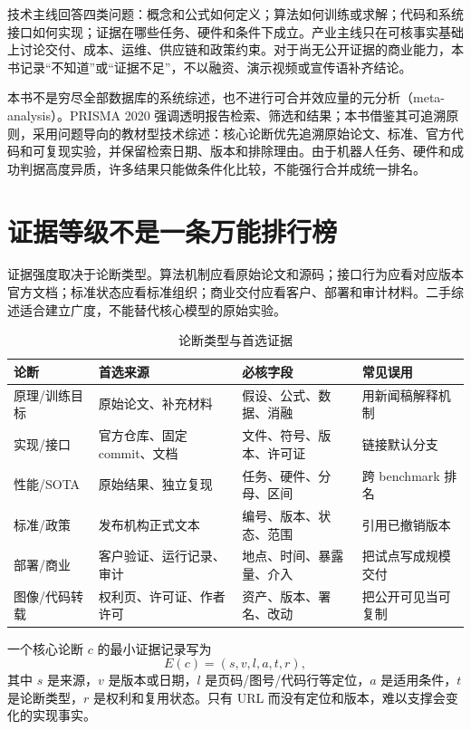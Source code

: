 技术主线回答四类问题：概念和公式如何定义；算法如何训练或求解；代码和系统接口如何实现；证据在哪些任务、硬件和条件下成立。产业主线只在可核事实基础上讨论交付、成本、运维、供应链和政策约束。对于尚无公开证据的商业能力，本书记录“不知道”或“证据不足”，不以融资、演示视频或宣传语补齐结论。

\begingroup{}
本书不是穷尽全部数据库的系统综述，也不进行可合并效应量的元分析（meta-analysis）。PRISMA 2020 强调透明报告检索、筛选和结果\cite{page2021prisma}；本书借鉴其可追溯原则，采用问题导向的教材型技术综述：核心论断优先追溯原始论文、标准、官方代码和可复现实验，并保留检索日期、版本和排除理由。由于机器人任务、硬件和成功判据高度异质，许多结果只能做条件化比较，不能强行合并成统一排名。
\endgroup

\section{证据等级不是一条万能排行榜}

证据强度取决于论断类型。算法机制应看原始论文和源码；接口行为应看对应版本官方文档；标准状态应看标准组织；商业交付应看客户、部署和审计材料。二手综述适合建立广度，不能替代核心模型的原始实验。

\begin{table}[H]
\centering
\caption{论断类型与首选证据}
\label{tab:claim-evidence-map}
\begin{tabularx}{\textwidth}{p{}YYp{0.22\textwidth}}
\toprule
论断 & 首选来源 & 必核字段 & 常见误用 \\
\midrule
原理/训练目标 & 原始论文、补充材料 & 假设、公式、数据、消融 & 用新闻稿解释机制 \\
实现/接口 & 官方仓库、固定 commit、文档 & 文件、符号、版本、许可证 & 链接默认分支 \\
性能/SOTA & 原始结果、独立复现 & 任务、硬件、分母、区间 & 跨 benchmark 排名 \\
标准/政策 & 发布机构正式文本 & 编号、版本、状态、范围 & 引用已撤销版本 \\
部署/商业 & 客户验证、运行记录、审计 & 地点、时间、暴露量、介入 & 把试点写成规模交付 \\
图像/代码转载 & 权利页、许可证、作者许可 & 资产、版本、署名、改动 & 把公开可见当可复制 \\
\bottomrule
\end{tabularx}
\end{table}

一个核心论断 $c$ 的最小证据记录写为
\begin{equation}
E(c)=(s,v,l,a,t,r),
\label{eq:claim-evidence-record}
\end{equation}
其中 $s$ 是来源，$v$ 是版本或日期，$l$ 是页码/图号/代码行等定位，$a$ 是适用条件，$t$ 是论断类型，$r$ 是权利和复用状态。只有 URL 而没有定位和版本，难以支撑会变化的实现事实。

